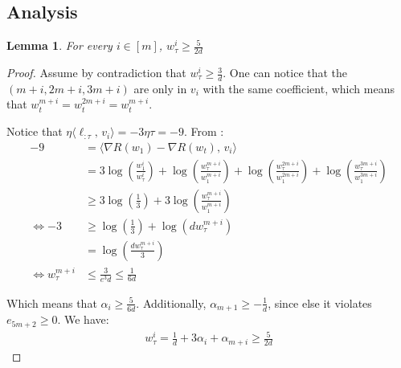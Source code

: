\documentclass[10pt]{article}
\newtheorem{lemma}[theorem]{Lemma}
\theoremstyle{definition}
\theoremstyle{remark}
\newcommand\inprod[2]{\langle #1,\,#2 \rangle}
\newcommand{\roundy}[1]{ {\left( #1 \right)}}
\begin{document}
\subsection{Analysis}
\begin{lemma} \label{lem:first cors high}
For every $i\in[m]$, $w_\tau^i \ge \frac{5}{2d}$
\end{lemma}
\begin{proof}
Assume by contradiction that $w_\tau^i \ge \frac{3}{d}$. One can notice that the $(m+i,2m+i,3m+i)$ are only in $v_i$ with the same coefficient, which means that $w_t^{m+i}=w_t^{2m+i}=w_t^{m+i}$. 

Notice that $\eta\inprod{\ell_{:\tau}}{v_i} = -3\eta\tau = -9$. From :
\begin{align*}
    -9 &= \inprod{\nabla R(w_1) - \nabla R(w_t)}{v_i} \\
    &= 3\log\roundy{\frac{w_1^i}{w_\tau^i}} + \log\roundy{\frac{w_\tau^{m+i}}{w_1^{m+i}}} + \log\roundy{\frac{w_\tau^{2m+i}}{w_1^{2m+i}}} + \log\roundy{\frac{w_\tau^{3m+i}}{w_1^{3m+i}}} \\
    &\ge 3\log\roundy{\frac{1}{3}} + 3\log\roundy{\frac{w_\tau^{m+i}}{w_1^{m+i}}}\\
    \Longleftrightarrow -3 &\ge \log\roundy{\frac{1}{3}} + \log\roundy{dw_\tau^{m+i}}\\
    &= \log\roundy{\frac{dw_\tau^{m+i}}{3}} \\
    \Longleftrightarrow w_\tau^{m+i} &\le \frac{3}{e^{3}d} \le \frac{1}{6d}
\end{align*}

Which means that $\alpha_i \ge \frac{5}{6d}$. Additionally, $\alpha_{m+1} \ge -\frac{1}{d}$, since else it violates $e_{5m+2} \ge 0$. We have:
\begin{align*}
    w_\tau^i = \frac{1}{d} + 3\alpha_i + \alpha_{m+i} \ge \frac{5}{2d}
\end{align*}
\end{proof} 
\end{document}
